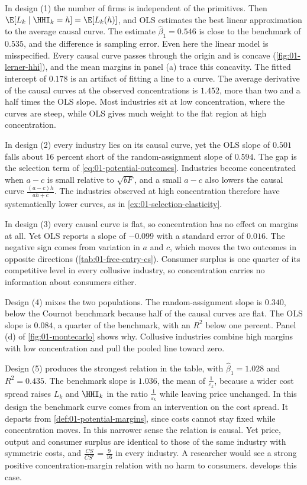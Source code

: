 In design (1) the number of firms is independent of the primitives. Then $\E[L_k \mid \HHI_k = h] =
\E[L_k(h)]$, and OLS estimates the best linear approximation to the average causal curve. The estimate
$\hat\beta_1 = 0.546$ is close to the benchmark of $0.535$, and the difference is sampling error. Even here
the linear model is misspecified. Every causal curve passes through the origin and is concave
(\cref{fig:01-lerner-hhi}), and the mean margins in panel (a) trace this concavity. The fitted intercept
of $0.178$ is an artifact of fitting a line to a curve. The average derivative of the causal curves at the
observed concentrations is $1.452$, more than two and a half times the OLS slope. Most industries sit at low
concentration, where the curves are steep, while OLS gives much weight to the flat region at high
concentration.

In design (2) every industry lies on its causal curve, yet the OLS slope of $0.501$ falls about 16 percent
short of the random-assignment slope of $0.594$. The gap is the selection term of
\eqref{eq:01-potential-outcomes}. Industries become concentrated when $a - c$ is small relative to
$\sqrt{bF}$, and a small $a - c$ also lowers the causal curve $\frac{(a - c) h}{a h + c}$. The industries
observed at high concentration therefore have systematically lower curves, as in
\cref{ex:01-selection-elasticity}.

In design (3) every causal curve is flat, so concentration has no effect on margins at all. Yet OLS
reports a slope of $-0.099$ with a standard error of $0.016$. The negative sign comes from variation in
$a$ and $c$, which moves the two outcomes in opposite directions (\cref{tab:01-free-entry-cs}). Consumer
surplus is one quarter of its competitive level in every collusive industry, so concentration carries no
information about consumers either.

Design (4) mixes the two populations. The random-assignment slope is $0.340$, below the Cournot
benchmark because half of the causal curves are flat. The OLS slope is $0.084$, a quarter of the
benchmark, with an $R^2$ below one percent. Panel (d) of \cref{fig:01-montecarlo} shows why. Collusive
industries combine
high margins with low concentration and pull the pooled line toward zero.

Design (5) produces the strongest relation in the table, with $\hat\beta_1 = 1.028$ and $R^2 = 0.435$. The
benchmark slope is $1.036$, the mean of $\frac{1}{\varepsilon_k}$, because a wider cost spread raises
$L_k$ and $\HHI_k$ in the ratio $\frac{1}{\varepsilon_k}$ while leaving price unchanged. In this design the
benchmark curve comes from an intervention on the cost spread. It departs from
\cref{def:01-potential-margins}, since costs cannot stay fixed while concentration moves. In this narrower
sense the relation is causal. Yet price, output and consumer surplus are identical to those of the same industry
with symmetric costs, and $\frac{CS}{CS^c} = \frac{9}{16}$ in every industry. A researcher would see a
strong positive concentration-margin relation with no harm to consumers.  develops
this case.

